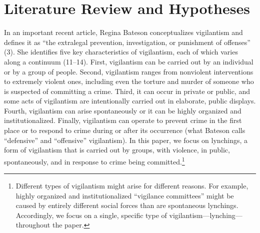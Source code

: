 \documentclass[12pt,ansiapaper]{article}
\begin{document}
\section{Literature Review and Hypotheses}
\label{sec:theory}

In an important recent article, Regina Bateson \citeyearpar{bateson2020politics} conceptualizes vigilantism and defines it as ``the extralegal prevention, investigation, or punishment of offenses'' (3). She identifies five key characteristics of vigilantism, each of which varies along a continuum (11--14). First, vigilantism can be carried out by an individual or by a group of people. Second, vigilantism ranges from nonviolent interventions to extremely violent ones, including even the torture and murder of someone who is suspected of committing a crime. Third, it can occur in private or public, and some acts of vigilantism are intentionally carried out in elaborate, public displays. Fourth, vigilantism can arise spontaneously or it can be highly organized and institutionalized. Finally, vigilantism can operate to prevent crime in the first place or to respond to crime during or after its occurrence (what Bateson calls ``defensive'' and ``offensive'' vigilantism). In this paper, we focus on lynchings, a form of vigilantism that is carried out by groups, with violence, in public, spontaneously, and in response to crime being committed.\footnote{Different types of vigilantism might arise for different reasons. For example, highly organized and institutionalized ``vigilance committees'' might be caused by entirely different social forces than are spontaneous lynchings. Accordingly, we focus on a single, specific type of vigilantism---lynching---throughout the paper.}  
\end{document}
